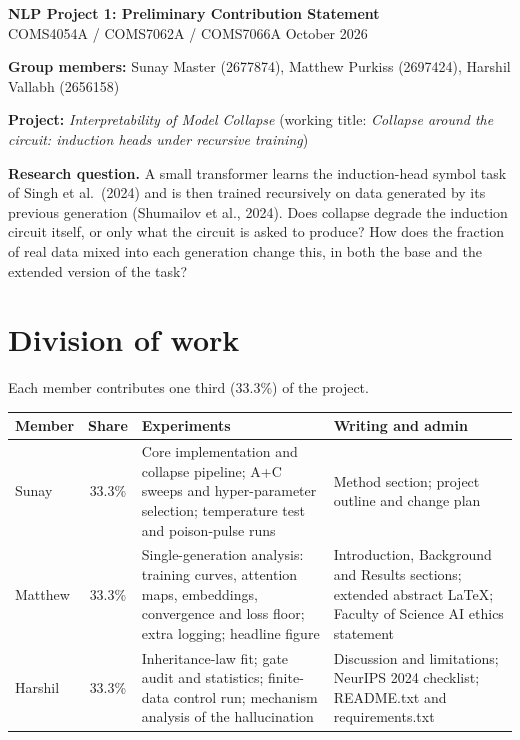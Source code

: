 \documentclass[11pt,a4paper]{article}
\begin{document}
{\centering
{\Large\textbf{NLP Project 1: Preliminary Contribution Statement}}\\[0.3em]
COMS4054A / COMS7062A / COMS7066A \quad\textbullet{} October 2026\\[0.8em]
}

\textbf{Group members:} Sunay Master (2677874), Matthew Purkiss (2697424), Harshil Vallabh (2656158)

\textbf{Project:} \emph{Interpretability of Model Collapse} (working title: \emph{Collapse around the circuit: induction heads under recursive training})

\textbf{Research question.} A small transformer learns the induction-head symbol task of
Singh et al.\ (2024) and is then trained recursively on data generated by its previous
generation (Shumailov et al., 2024). Does collapse degrade the induction circuit itself, or
only what the circuit is asked to produce? How does the fraction of real data mixed into each
generation change this, in both the base and the extended version of the task?

\section*{Division of work}

Each member contributes one third (33.3\%) of the project.

\begin{tabularx}{\textwidth}{@{}l c >{\raggedright\arraybackslash}X >{\raggedright\arraybackslash}X@{}}
\toprule
\textbf{Member} & \textbf{Share} & \textbf{Experiments} & \textbf{Writing and admin} \\
\midrule
Sunay   & 33.3\% & Core implementation and collapse pipeline; A+C sweeps and hyper-parameter selection; temperature test and poison-pulse runs
        & Method section; project outline and change plan \\
Matthew & 33.3\% & Single-generation analysis: training curves, attention maps, embeddings, convergence and loss floor; extra logging; headline figure
        & Introduction, Background and Results sections; extended abstract LaTeX; Faculty of Science AI ethics statement \\
Harshil & 33.3\% & Inheritance-law fit; gate audit and statistics; finite-data control run; mechanism analysis of the hallucination
        & Discussion and limitations; NeurIPS 2024 checklist; README.txt and requirements.txt \\
\bottomrule
\end{tabularx}
\end{document}
